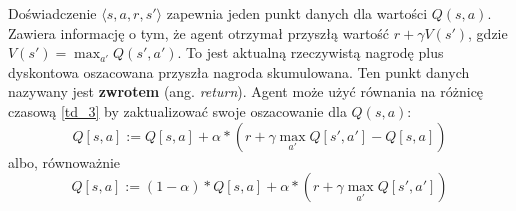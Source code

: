 \documentclass[a4paper, 12pt,oneside]{book}
\begin{document}
Doświadczenie $\langle s,a,r,s' \rangle$ zapewnia jeden punkt danych dla
wartości $Q(s,a)$. Zawiera informację o tym, że agent otrzymał przyszłą wartość
$r + \gamma V(s')$, gdzie $V(s') = \max_{a'}Q(s',a')$. To jest aktualną
rzeczywistą nagrodę plus dyskontowa oszacowana przyszła nagroda skumulowana.
Ten punkt danych nazywany jest \textbf{zwrotem} (ang. \textit{return}). Agent
może użyć równania na różnicę czasową \ref{td_3} by zaktualizować swoje
oszacowanie dla $Q(s,a)$:
\begin{equation}
Q[s,a] := Q[s,a] + \alpha * \left(r + \gamma \max_{a'} Q[s',a'] -
Q[s,a]\right)
\label{qvalue_1}
\end{equation}
albo, równoważnie
\begin{equation}
Q[s,a] := (1 - \alpha) * Q[s,a] + \alpha * \left(r + \gamma \max_{a'}
Q[s',a'] \right)
\label{qvalue_2}
\end{equation}
\end{document}
